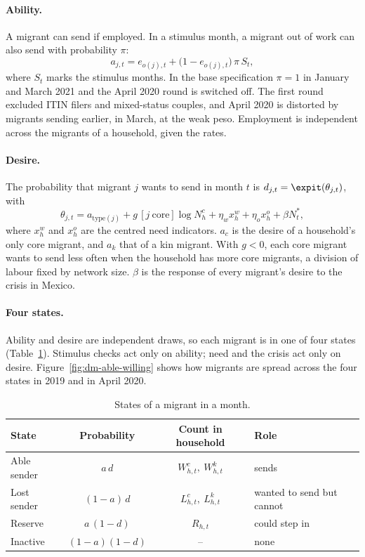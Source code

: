 \paragraph{Ability.} A migrant can send if employed. In a stimulus month, a migrant out of work can also send with probability $\pi$:
\begin{equation}
a_{j,t} = e_{o(j),t} + \big(1 - e_{o(j),t}\big)\,\pi\,S_t ,
\end{equation}
where $S_t$ marks the stimulus months. In the base specification $\pi = 1$ in January and March 2021 and the April 2020 round is switched off. The first round excluded ITIN filers and mixed-status couples, and April 2020 is distorted by migrants sending earlier, in March, at the weak peso. Employment is independent across the migrants of a household, given the rates.

\paragraph{Desire.} The probability that migrant $j$ wants to send in month $t$ is $d_{j,t} = \expit(\theta_{j,t})$, with
\begin{equation}
\theta_{j,t} = a_{\mathrm{type}(j)} + g\,[j\ \text{core}]\log N^c_h + \eta_w x^w_h + \eta_o x^o_h + \beta N^*_t ,
\end{equation}
where $x^w_h$ and $x^o_h$ are the centred need indicators. $a_c$ is the desire of a household's only core migrant, and $a_k$ that of a kin migrant. With $g < 0$, each core migrant wants to send less often when the household has more core migrants, a division of labour fixed by network size. $\beta$ is the response of every migrant's desire to the crisis in Mexico.

\paragraph{Four states.} Ability and desire are independent draws, so each migrant is in one of four states (Table~\ref{tab:dm-states}). Stimulus checks act only on ability; need and the crisis act only on desire. Figure~\ref{fig:dm-able-willing} shows how migrants are spread across the four states in 2019 and in April 2020.

\begin{table}[ht]
\centering
\caption{States of a migrant in a month.}
\label{tab:dm-states}
\begin{tabular}{lccl}
\toprule
State & Probability & Count in household & Role \\
\midrule
Able sender & $a\,d$ & $W^c_{h,t},\ W^k_{h,t}$ & sends \\
Lost sender & $(1-a)\,d$ & $L^c_{h,t},\ L^k_{h,t}$ & wanted to send but cannot \\
Reserve & $a\,(1-d)$ & $R_{h,t}$ & could step in \\
Inactive & $(1-a)(1-d)$ & -- & none \\
\bottomrule
\end{tabular}
\end{table}

